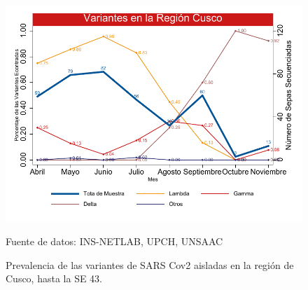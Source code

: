 \documentclass[12pt,a4paper,openany]{book}
\begin{document}
		\begin{figure}[h]
			\caption{Prevalencia de las variantes de SARS Cov2 aisladas en la región de Cusco, hasta la SE 43. }\label{fig:variantes}
			\begin{center}
				\includegraphics[width=0.7\linewidth]{../figuras/variantes.pdf}
			\end{center}
			{\footnotesize {Fuente de datos: INS-NETLAB, UPCH, UNSAAC}}
		\end{figure}
  
\end{document}
